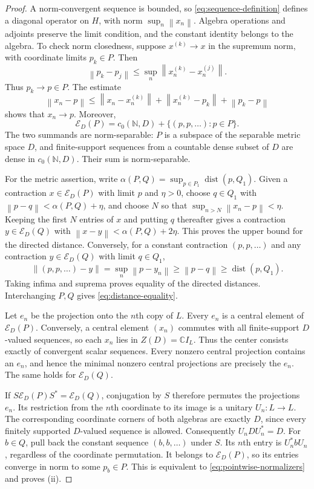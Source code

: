 \documentclass[11pt]{article}
\theoremstyle{definition}
\theoremstyle{remark}
\newcommand{\C}{\mathbb C}
\newcommand{\N}{\mathbb N}
\newcommand{\E}{\mathcal E}
\newcommand{\id}{I}
\newcommand{\norm}[1]{\left\|#1\right\|}
\DeclareMathOperator{\dist}{dist}
\begin{document}
\begin{proof}
A norm-convergent sequence is bounded, so \eqref{eq:sequence-definition}
defines a diagonal operator on $H$, with norm $\sup_n\norm{x_n}$.
Algebra operations and adjoints preserve the limit condition, and the
constant identity belongs to the algebra. To check norm closedness,
suppose $x^{(k)}\to x$ in the supremum norm, with coordinate limits
$p_k\in P$. Then
\[
\norm{p_k-p_j}\le\sup_n\norm{x_n^{(k)}-x_n^{(j)}}.
\]
Thus $p_k\to p\in P$. The estimate
\[
\norm{x_n-p}\le\norm{x_n-x_n^{(k)}}
+\norm{x_n^{(k)}-p_k}+\norm{p_k-p}
\]
shows that $x_n\to p$. Moreover,
\begin{equation}\label{eq:sum-decomposition}
\E_D(P)=c_0(\N,D)+\{(p,p,\ldots):p\in P\}.
\end{equation}
The two summands are norm-separable: $P$ is a subspace of the separable
metric space $D$, and finite-support sequences from a countable dense
subset of $D$ are dense in $c_0(\N,D)$. Their sum is norm-separable.

For the metric assertion, write
$\alpha(P,Q)=\sup_{p\in P_1}\dist(p,Q_1)$.
Given a contraction $x\in\E_D(P)$ with limit $p$ and $\eta>0$, choose
$q\in Q_1$ with $\norm{p-q}<\alpha(P,Q)+\eta$, and choose $N$ so that
$\sup_{n>N}\norm{x_n-p}<\eta$. Keeping the first $N$ entries of $x$ and
putting $q$ thereafter gives a contraction $y\in\E_D(Q)$ with
$\norm{x-y}<\alpha(P,Q)+2\eta$. This proves the upper bound for the
directed distance. Conversely, for a constant contraction $(p,p,\ldots)$
and any contraction $y\in\E_D(Q)$ with limit $q\in Q_1$,
\[
\norm{(p,p,\ldots)-y}=\sup_n\norm{p-y_n}\ge\norm{p-q}
\ge\dist(p,Q_1).
\]
Taking infima and suprema proves equality of the directed distances.
Interchanging $P,Q$ gives \eqref{eq:distance-equality}.

Let $e_n$ be the projection onto the $n$th copy of $L$. Every $e_n$ is a
central element of $\E_D(P)$. Conversely, a central element $(x_n)$
commutes with all finite-support $D$-valued sequences, so each $x_n$ lies
in $Z(D)=\C\id_L$. Thus the center consists exactly of convergent scalar
sequences. Every nonzero central projection contains an $e_n$, and hence
the minimal nonzero central projections are precisely the $e_n$.
The same holds for $\E_D(Q)$.

If $S\E_D(P)S^*=\E_D(Q)$, conjugation by $S$ therefore permutes the
projections $e_n$. Its restriction from the $n$th coordinate to its image
is a unitary $U_n:L\to L$. The corresponding coordinate corners of both
algebras are exactly $D$, since every finitely supported $D$-valued
sequence is allowed. Consequently $U_nDU_n^*=D$. For $b\in Q$, pull back
the constant sequence $(b,b,\ldots)$ under $S$. Its $n$th entry is
$U_n^*bU_n$, regardless of the coordinate permutation. It belongs to
$\E_D(P)$, so its entries converge in norm to some $p_b\in P$.
This is equivalent to \eqref{eq:pointwise-normalizers} and proves (ii).


\end{proof}
\end{document}
